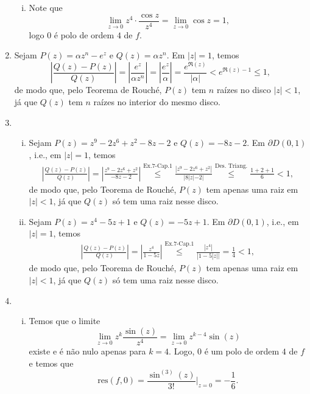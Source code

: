 \documentclass[12pt,a4paper]{article}
\newcommand{\res}{\mathrm{res}}
\begin{document}
\begin{enumerate}
\begin{enumerate}[(i)]
			\item Note que 
			$$
			\lim\limits_{z\to 0}z^4\cdot\frac{\cos z}{z^4} = \lim\limits_{z\to 0}\cos z = 1,
			$$
			logo $0$ é polo de ordem $4$ de $f$.
		\end{enumerate}
		
		\item Sejam $P(z) = \alpha z^n - e^z$ e $Q(z) = \alpha z^n$. Em $|z| = 1$, temos
		$$
		\left| \frac{Q(z) - P(z)}{Q(z)} \right| = \left| \frac{e^z}{\alpha z^n} \right| = \left| \frac{e^z}{\alpha} \right| = \frac{e^{\Re(z)}}{|\alpha|} < e^{\Re(z) - 1} \leq 1,
		$$
		de modo que, pelo Teorema de Rouché, $P(z)$ tem $n$ raízes no disco $|z| < 1$, já que $Q(z)$ tem $n$ raízes no interior do mesmo disco.
		
		\item\begin{enumerate}[(i)]
			\item Sejam $P(z) = z^9 - 2z^6 + z^2 - 8z - 2$ e $Q(z) = -8z - 2$. Em $\partial D(0,1)$, i.e., em $|z|=1$, temos
			\begin{align*}
			\left| \frac{Q(z) - P(z)}{Q(z)} \right| = \left| \frac{z^9 - 2z^6 + z^2}{-8z-2} \right| \stackrel{\text{Ex.7-Cap.1}}{\leq} \frac{|z^9 - 2z^6 + z^2|}{|8|z| - 2|} \stackrel{\text{Des. Triang.}}{\leq} \frac{1+2+1}{6} < 1,
			\end{align*}
			de modo que, pelo Teorema de Rouché, $P(z)$ tem apenas uma raiz em $|z|<1$, já que $Q(z)$ só tem uma raiz nesse disco.
			
			\item Sejam $P(z) = z^4 - 5z + 1$ e $Q(z) = -5z + 1$. Em $\partial D(0,1)$, i.e., em $|z|=1$, temos
			\begin{align*}
			\left| \frac{Q(z) - P(z)}{Q(z)} \right| = \left| \frac{z^4}{1-5z} \right| \stackrel{\text{Ex.7-Cap.1}}{\leq} \frac{|z^4|}{|1 - 5|z||} = \frac{1}{4} < 1,
			\end{align*}
			de modo que, pelo Teorema de Rouché, $P(z)$ tem apenas uma raiz em $|z|<1$, já que $Q(z)$ só tem uma raiz nesse disco.
		\end{enumerate}
		
		\item\begin{enumerate}[(i)]
			\item Temos que o limite
			$$
			\lim\limits_{z\to 0}z^k\frac{\sin(z)}{z^4} = \lim\limits_{z\to 0}z^{k-4}\sin(z)
			$$
			existe e é não nulo apenas para $k=4$. Logo, $0$ é um polo de ordem $4$ de $f$ e temos que
			$$
			\res(f,0) = \frac{\sin^{(3)}(z)}{3!}\Bigg|_{z=0} = -\frac{1}{6}.
			$$
			

\end{enumerate}
\end{enumerate}
\end{document}
